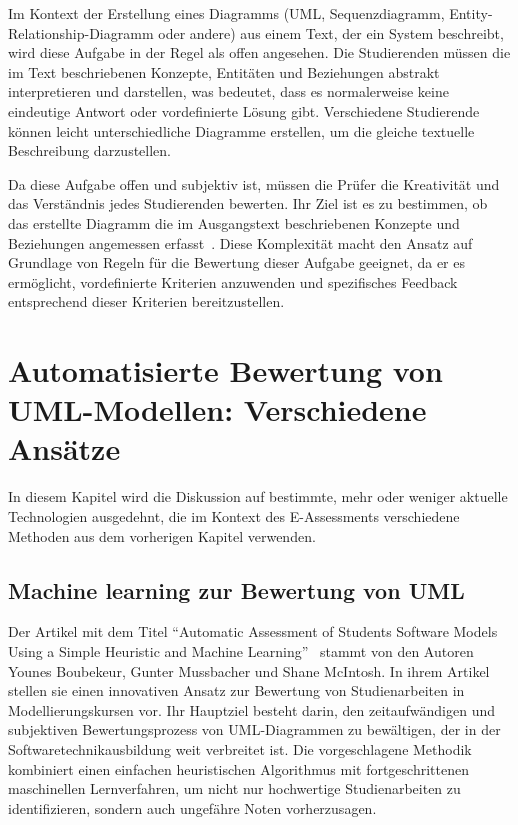 Im Kontext der Erstellung eines Diagramms (UML, Sequenzdiagramm, Entity-Relationship-Diagramm oder andere) aus einem Text, der ein System beschreibt, wird diese Aufgabe in der Regel als offen angesehen. Die Studierenden müssen die im Text beschriebenen Konzepte, Entitäten und Beziehungen abstrakt interpretieren und darstellen, was bedeutet, dass es normalerweise keine eindeutige Antwort oder vordefinierte Lösung gibt. Verschiedene Studierende können leicht unterschiedliche Diagramme erstellen, um die gleiche textuelle Beschreibung darzustellen.

Da diese Aufgabe offen und subjektiv ist, müssen die Prüfer die Kreativität und das Verständnis jedes Studierenden bewerten. Ihr Ziel ist es zu bestimmen, ob das erstellte Diagramm die im Ausgangstext beschriebenen Konzepte und Beziehungen angemessen erfasst~\cite{fellmann2016evaluation}. Diese Komplexität macht den Ansatz auf Grundlage von Regeln für die Bewertung dieser Aufgabe geeignet, da er es ermöglicht, vordefinierte Kriterien anzuwenden und spezifisches Feedback entsprechend dieser Kriterien bereitzustellen.


\section{Automatisierte Bewertung von UML-Modellen: Verschiedene Ansätze}\label{sec:automatisierte-bewertung-von-uml-modellen:-verschiedene-ansatze}

In diesem Kapitel wird die Diskussion auf bestimmte, mehr oder weniger aktuelle Technologien ausgedehnt, die im Kontext des E-Assessments verschiedene Methoden aus dem vorherigen Kapitel verwenden.

\subsection{Machine learning zur Bewertung von UML}

Der Artikel mit dem Titel ``Automatic Assessment of Students Software Models Using a Simple Heuristic and Machine
Learning''~\cite{boubekeur2020automatic} stammt von den Autoren Younes Boubekeur, Gunter Mussbacher und Shane McIntosh.
In ihrem Artikel stellen sie einen innovativen Ansatz zur Bewertung von Studienarbeiten in Modellierungskursen vor. Ihr
Hauptziel besteht darin, den zeitaufwändigen und subjektiven Bewertungsprozess von UML-Diagrammen zu bewältigen, der in
der Softwaretechnikausbildung weit verbreitet ist. Die vorgeschlagene Methodik kombiniert einen einfachen heuristischen
Algorithmus mit fortgeschrittenen maschinellen Lernverfahren, um nicht nur hochwertige Studienarbeiten zu
identifizieren, sondern auch ungefähre Noten vorherzusagen.

